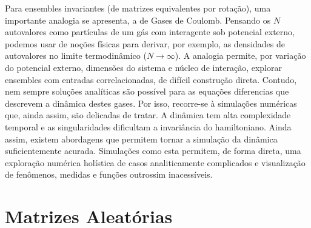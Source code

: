 Para ensembles invariantes (de matrizes equivalentes por rotação), uma importante analogia se apresenta, a de Gases de Coulomb. Pensando os $N$ autovalores como partículas de um gás com interagente sob potencial externo, podemos usar de noções físicas para derivar, por exemplo, as densidades de autovalores no limite termodinâmico ($N \rightarrow \infty$). A analogia permite, por variação do potencial externo, dimensões do sistema e núcleo de interação, explorar ensembles com entradas correlacionadas, de difícil construção direta. Contudo, nem sempre soluções analíticas são possível para as equações diferencias que descrevem a dinâmica destes gases. Por isso, recorre-se à simulações numéricas que, ainda assim, são delicadas de tratar. A dinâmica tem alta complexidade temporal e as singularidades dificultam a invariância do hamiltoniano. Ainda assim, existem abordagens que permitem tornar a simulação da dinâmica suficientemente acurada. Simulações como esta permitem, de forma direta, uma exploração numérica holística de casos analiticamente complicados e visualização de fenômenos, medidas e funções outrossim inacessíveis.


\chapter{Matrizes Aleatórias}








